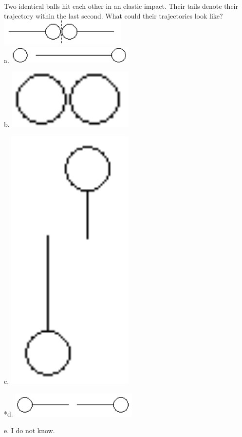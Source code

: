 
Two identical balls hit each other in an elastic impact.  Their tails denote their trajectory within the last second. What could their trajectories look like?
\includegraphics[width=2.5in]{../../Images/ImpulseAndMomentumQ7.png}\\

a. 
\includegraphics[width=2.5in]{../../Images/ImpulseAndMomentumQ7a.png}

b. 
\includegraphics[width=2.5in]{../../Images/ImpulseAndMomentumQ7b.png}

c. 
\includegraphics[width=2.5in]{../../Images/ImpulseAndMomentumQ7c.png}

*d. 
\includegraphics[width=2.5in]{../../Images/ImpulseAndMomentumQ7d.png}

e. I do not know. \\
